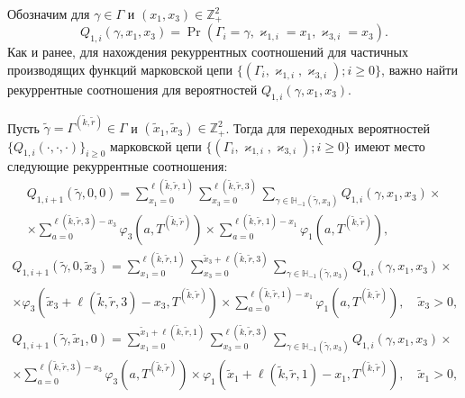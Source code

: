 Обозначим для $\gamma \in \Gamma$ и $(x_1, x_3) \in {\mathbb Z}_+^2$
\begin{equation}
Q_{1, i}(\gamma, x_1, x_3) = \Pr(\Gamma_{i}=\gamma,  \varkappa_{1, i}=x_1,  \varkappa_{3, i}=x_3).
\end{equation}
Как и ранее, для нахождения рекуррентных соотношений для частичных производящих функций марковской цепи $\{(\Gamma_i,  \varkappa_{1, i}, \varkappa_{3, i}); i \geqslant 0\}$, важно найти рекуррентные соотношения для вероятностей $Q_{1, i}(\gamma, x_1, x_3)$.
\begin{theorem}
Пусть $\tilde{\gamma} =\Gamma^{(\tilde{k}, \tilde{r})}\in \Gamma$ и $(\tilde{x}_1,  \tilde{x}_3) \in {\mathbb Z}_+^2$. Тогда для переходных вероятностей $\{Q_{1, i}(\cdot, \cdot, \cdot)\}_{i\geqslant 0}$ марковской цепи $\{(\Gamma_i,  \varkappa_{1, i}, \varkappa_{3, i}); i \geqslant 0\} $ имеют место следующие рекуррентные соотношения:
\begin{multline*}
Q_{1, i+1}(\tilde{\gamma}, 0,  0)= 
\sum_{x_1=0}^{\ell(\tilde{k}, \tilde{r}, 1)} \sum_{x_3=0}^{\ell(\tilde{k}, \tilde{r}, 3)} \sum_{\gamma \in {\mathbb H}_{-1}(\tilde{\gamma}, x_3)}Q_{1, i}(\gamma, x_1,  x_3)\times \\ \times
\sum_{a=0}^{\ell(\tilde{k}, \tilde{r}, 3)-x_3}\varphi_3(a, T^{(\tilde{k}, \tilde{r})}) \times \sum_{a=0}^{\ell(\tilde{k}, \tilde{r}, 1)-x_1}\varphi_1(a, T^{(\tilde{k}, \tilde{r})}), 
\end{multline*}
\begin{multline*}
Q_{1, i+1}(\tilde{\gamma}, 0,  \tilde{x}_3)= 
\sum_{x_1=0}^{\ell(\tilde{k}, \tilde{r}, 1)} \sum_{x_3=0}^{\tilde{x}_3 + \ell(\tilde{k}, \tilde{r}, 3)} \sum_{\gamma \in {\mathbb H}_{-1}(\tilde{\gamma}, x_3)}Q_{1, i}(\gamma, x_1,  x_3) \times  \\ \times \varphi_3(\tilde{x}_3 + \ell(\tilde{k}, \tilde{r}, 3) - x_3, T^{(\tilde{k}, \tilde{r})})  \times \sum_{a=0}^{\ell(\tilde{k}, \tilde{r}, 1)-x_1}\varphi_1(a, T^{(\tilde{k}, \tilde{r})}),  \quad \tilde{x}_3 > 0, 
\end{multline*}
\begin{multline*}
Q_{1, i+1}(\tilde{\gamma}, \tilde{x}_1,  0)= 
\sum_{x_1=0}^{\tilde{x}_1 + \ell(\tilde{k}, \tilde{r}, 1) } \sum_{x_3=0}^{\ell(\tilde{k}, \tilde{r}, 3)} \sum_{\gamma \in {\mathbb H}_{-1}(\tilde{\gamma}, x_3)}Q_{1, i}(\gamma, x_1,  x_3) \times  \\ \times \sum_{a=0}^{\ell(\tilde{k}, \tilde{r}, 3)-x_3}\varphi_3(a, T^{(\tilde{k}, \tilde{r})}) \times \varphi_1(\tilde{x}_1 + \ell(\tilde{k}, \tilde{r}, 1) - x_1, T^{(\tilde{k}, \tilde{r})}),  \quad \tilde{x}_1 > 0, 

\end{multline*}
\end{theorem}
